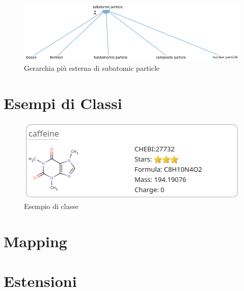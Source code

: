 \documentclass[12pt,a4paper,openright,twoside]{book}
\begin{document}
\begin{figure}[H]
	\centering
	\includegraphics[width=\linewidth]{figures/subatomic-particle.png}
	\caption{Gerarchia più esterna di subatomic particle}
	\label{fig:SubatomicParticle}
\end{figure}

\chapter{Esempi di Classi}
\label{chap:classexamples}

\begin{figure}[H]
	\centering
	\includegraphics[width=\linewidth]{figures/class.png}
	\caption{Esempio di classe}
	\label{fig:Class}
\end{figure}



\chapter{Mapping} %
\label{chap:mapping}

\chapter{Estensioni} %
\label{chap:extensions}
\end{document}
